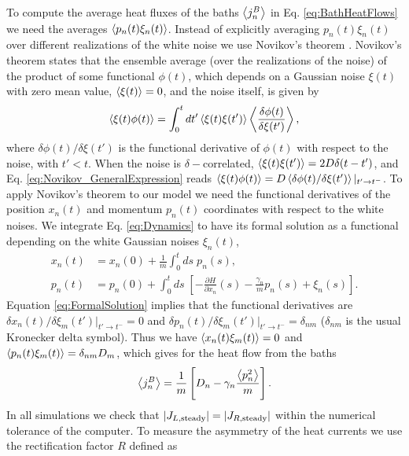 To compute the average heat fluxes of the baths $\expval{j^B_n}$ in Eq. \eqref{eq:BathHeatFlows} we need
the averages $\expval{p_n(t)\xi_n(t)}$. Instead of explicitly averaging $p_n(t)\xi_n(t)$ over different realizations of the white noise we use Novikov's theorem \cite{Novikov1965,Ma2011,Toral2014}. Novikov's theorem states that the ensemble average (over  the realizations of the noise) of the product of some functional $\phi(t)$, which depends on a Gaussian noise $\xi(t)$ with zero mean value, $\expval{\xi(t)} = 0$, and the noise itself, is given by
%
\begin{equation}
    \expval{\xi(t)\phi(t)} = \int_0^t dt' \expval{\xi(t)\xi(t')} \expval{\frac{\delta \phi(t)}{\delta\xi(t')}},
    \label{eq:Novikov_GeneralExpression}
\end{equation}
%
where ${\delta \phi(t)}/{\delta\xi(t')}$ is the functional derivative of $\phi(t)$ with respect to the noise, with $t'<t$. When the noise is $\delta-$correlated, $\expval{\xi(t)\xi(t')}=2D\delta(t-t')$, and Eq. \eqref{eq:Novikov_GeneralExpression} reads $\expval{\xi(t)\phi(t)} = D \expval{{\delta \phi(t)}/{\delta\xi(t')}}|_{t' \to t^-}$. To apply Novikov's theorem to our model we need the functional derivatives of the position $x_n(t)$ and momentum $p_n(t)$ coordinates with respect to the white noises. We integrate Eq. \eqref{eq:Dynamics} to have its formal solution as a functional depending on the white Gaussian noises $\xi_n(t)$,
%
\begin{equation}
    \begin{split}
        x_n(t) &= x_n(0) +  \frac{1}{m}\int_0^t ds\; p_n(s) ,\\
        p_n(t) &= p_n(0) + \int_0^t ds\; \left[ -\frac{\partial H}{\partial x_n}(s) - \frac{\gamma_n}{m}p_n(s) + \xi_n(s)\right].
    \end{split}
    \label{eq:FormalSolution}
\end{equation}
%
Equation \eqref{eq:FormalSolution} implies that the functional derivatives are ${\delta x_n(t)}/{\delta \xi_m(t')}|_{t'\to t^-} = 0$ and
${\delta p_n(t)}/{\delta \xi_m(t')}|_{t'\to t^-} = \delta_{nm}$ ($\delta_{nm}$ is the usual Kronecker delta symbol). Thus we have $\expval{x_n(t) \xi_m(t)} = 0$ and $\expval{p_n(t) \xi_m(t)} = \delta_{nm}D_m$, which gives for the heat flow from the baths
%
\begin{equation}
    \expval{j^B_n} = \frac{1}{m} \left[ D_n-\gamma_n \frac{\expval{p_n^2}}{m} \right].
\end{equation}
%
In all simulations we check that $|J_{L,{\rm steady}}|=|J_{R,{\rm steady}}|$ within the numerical tolerance of the computer. To measure the asymmetry of the heat currents we use the rectification factor $R$ defined as
